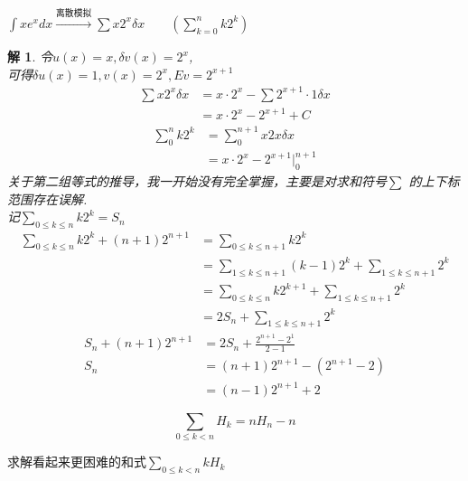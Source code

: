 \documentclass[mode=geye, chinesefont=founder]{elegantnote}
\newtheorem{solve}{解}
\begin{document}
\begin{example}
    $ \int x e^x dx \xrightarrow[]{\text{离散模拟}} \sum x 2^x \delta x \qquad(\sum_{k=0}^{n}k2^k) $ 
\end{example}
\begin{solve}
    令$ u(x)=x, \delta v(x)=2^x $,\\
    可得$ \delta u(x)=1, v(x)=2^x,Ev = 2^{x+1} $  
    \begin{align*}
        \sum x2^x\delta x
        &= x\cdot 2^x - \sum 2^{x+1}\cdot 1\delta x\\
        &= x\cdot 2^x - 2^{x+1}+C
    \end{align*}
    \begin{align*}
        \sum_{0}^{n} k2^k
        &= \sum_{0}^{n+1}x2x\delta x\\
        &= x\cdot 2^x-2^{x+1}\Big|_0^{n+1}
    \end{align*}
    关于第二组等式的推导，我一开始没有完全掌握，主要是对求和符号$ \sum $ 的上下标范围存在误解.\\
    记$ \sum_{0\leqslant k\leqslant n} k 2^k = S_n $ 
    \begin{align*}
        \sum_{0\leqslant k\leqslant n} k 2^k + (n+1)2^{n+1}
        &= \sum_{0\leqslant k\leqslant n+1} k 2^k \\
        &= \sum_{1\leqslant k\leqslant n+1} (k-1) 2^k + \sum_{1\leqslant k\leqslant n+1} 2^k \\
        &= \sum_{0\leqslant k\leqslant n} k 2^{k+1} + \sum_{1\leqslant k\leqslant n+1} 2^k \\
        &= 2S_n + \sum_{1\leqslant k\leqslant n+1} 2^k 
    \end{align*}
    \begin{align*}
        S_n + (n+1)2^{n+1}
        &= 2S_n + \frac{2^{n+1}-2^1}{2-1}\\
        S_n &= (n+1)2^{n+1} - (2^{n+1}-2)\\
        &=(n-1)2^{n+1}+2
    \end{align*}
\end{solve}

\begin{equation}
    \sum_{0\leqslant k< n} H_k =nH_n-n
\end{equation}

求解看起来更困难的和式$ \sum_{0\leqslant k< n} k H_k $ 
\end{document}
